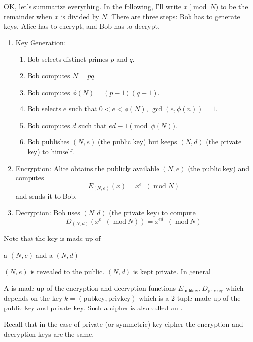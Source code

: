 OK, let's summarize everything.
In the following, I'll write $x \pmod{N}$ to be the remainder when $x$
is divided by $N$.
There are three steps: Bob has to
generate keys, Alice has to encrypt, and Bob has to decrypt.
\begin{enumerate}[nosep]
 \item Key Generation:
  \begin{enumerate}
   \item Bob selects distinct primes $p$ and $q$.
   \item Bob computes $N = pq$.
   \item Bob computes $\phi(N) = (p-1)(q-1)$.
   \item Bob selects $e$ such that $0 < e < \phi(N)$,
   $\gcd(e, \phi(n)) = 1$.
   \item Bob computes $d$ such that
     $ed \equiv 1 \pmod{\phi(N)}$.
 \item Bob publishes $(N,e)$ (the public key) but keeps $(N,d)$
   (the private key) to himself.
  \end{enumerate}
 \item Encryption:
   Alice obtains the publicly available $(N,e)$ (the public key) and
   computes
  \[
   E_{(N,e)}(x) = x^e \,\,\,(\operatorname{mod} N)
  \]
  and sends it to Bob.
 \item Decryption: Bob uses $(N,d)$ (the private key) to compute
 \[
  D_{(N,d)}( x^e \,\,\,(\operatorname{mod} N) ) = x^{ed} \,\,\,(\operatorname{mod} N)
 \]
\end{enumerate}

Note that the key is made up of
\begin{enumerate}[nosep]
  \li a  $(N,e)$ and
  \li a  $(N,d)$
\end{enumerate}
$(N,e)$ is revealed to the public.
$(N,d)$ is kept private.
In general

\begin{defn}
  A  is made up of the encryption
  and decryption functions
  $E_{\text{pubkey}}, D_{\text{privkey}}$ which depends on
  the key
  $k = (\text{pubkey}, \text{privkey})$
  which is a 2-tuple made up of
  the public key and private key.
  Such a cipher is also called an
  .
\end{defn}

Recall that in the case of private (or symmetric) key cipher
the encryption and decryption keys are the same. 

